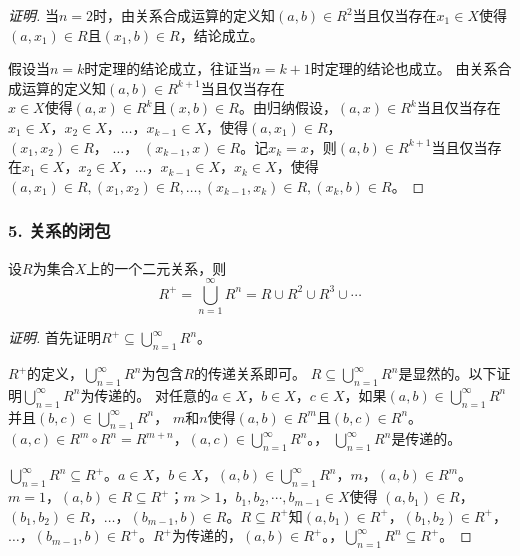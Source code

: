 \documentclass{beamer}
\begin{document}
\begin{CJK*}{UTF8}{gbsn}
\begin{frame}
\begin{proof}[证明]
  \pause 当$n=2$时，由关系合成运算的定义知$(a,b)\in R^2$当且仅当存在$x_1\in X$使得$(a,x_1)\in R$且$(x_1, b)\in R$，结论成立。

  \pause 假设当$n=k$时定理的结论成立，往证当$n=k+1$时定理的结论也成立。
  \pause 由关系合成运算的定义知$(a,b)\in R^{k+1}$当且仅当存在\\$x\in X$使得$(a,x)\in R^k$且$(x, b)\in R$。\pause 由归纳假设，$(a,x)\in R^k$当且仅当存在$x_1\in X$，$x_2\in X$，$\ldots$，$x_{k-1}\in X$，使得$(a, x_1) \in R$，\\ $(x_1, x_2)\in R$，  $\ldots$， $(x_{k-1}, x)\in R$。\pause 记$x_{k}=x$，则$(a,b)\in R^{k+1}$当且仅当存在$x_1\in X$，$x_2\in X$，$\ldots$，$x_{k-1}\in X$，$x_{k}\in X$，使得\\$(a, x_1) \in R,(x_1, x_2)\in R,\ldots,(x_{k-1}, x_k)\in R,(x_k, b)\in R$。
\end{proof}

\end{frame}
\begin{frame}
  \frametitle{5. 关系的闭包}
  \begin{Thm}
    设$R$为集合$X$上的一个二元关系，则
    \begin{equation*}
      R^+ = \bigcup_{n=1}^\infty R^n = R \cup R^2 \cup R^3 \cup \cdots 
    \end{equation*}
  \end{Thm}
  \vspace{-1cm}
  \begin{proof}[证明]\justifying\let\raggedright\justifying \small{
    \pause 首先证明$ R^+ \subseteq \bigcup_{n=1}^\infty R^n$。

    $R^+$的定义，$\bigcup_{n=1}^\infty R^n$为包含$R$的传递关系即可。
    \pause $R\subseteq \bigcup_{n=1}^\infty R^n$是显然的。\pause 以下证明$\bigcup_{n=1}^\infty R^n$为传递的。
    \pause 对任意的$a\in X$，$b\in X$，$c\in X$，\pause 如果$(a,b)\in \bigcup_{n=1}^\infty R^n$并且$(b,c)\in \bigcup_{n=1}^\infty R^n$，
    $m$和$n$使得$(a,b)\in R^m$且$(b,c)\in R^n$。$(a,c)\in R^m\circ R^n = R^{m+n}$，$(a,c)\in \bigcup_{n=1}^\infty R^n$。，
   \pause $\bigcup_{n=1}^\infty R^n$是传递的。

    $  \bigcup_{n=1}^\infty R^n\subseteq R^+$。$a\in X$，$b\in X$，$(a,b)\in \bigcup_{n=1}^\infty R^n$，$m$，$(a,b)\in R^m$。
    $m=1$，$(a,b)\in R\subseteq R^+$；$m>1$，$b_1,b_2,\cdots, b_{m-1}\in X$使得
    $(a,b_1)\in R$，$(b_1,b_2)\in R$，$\ldots$，$(b_{m-1},b)\in R$。$R\subseteq R^+$知$(a,b_1)\in R^+$，$(b_1,b_2)\in R^+$，$\ldots$，$(b_{m-1},b)\in R^+$。$R^+$为传递的，$(a,b)\in R^+$。，\pause$ \bigcup_{n=1}^\infty R^n\subseteq R^+$。

}
\end{proof}
\end{frame}
\end{CJK*}
\end{document}
